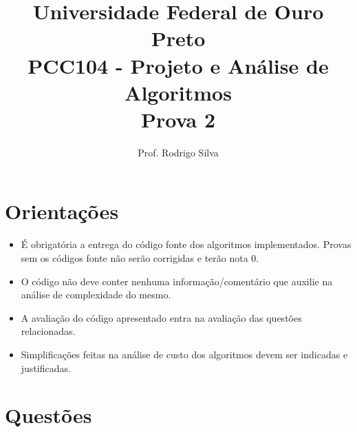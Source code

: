 \documentclass{article}
\title{\vspace{-2 cm}Universidade Federal de Ouro Preto \\ PCC104 - Projeto e Análise de Algoritmos \\ Prova 2}
\author{Prof. Rodrigo Silva}
\begin{document}
\maketitle

\section*{Orientações}

\begin{itemize}
    \item É obrigatória a entrega do código fonte dos algoritmos implementados. Provas sem os códigos fonte não serão corrigidas e terão nota 0.
    \item O código não deve conter nenhuma informação/comentário que auxilie na análise de complexidade do mesmo. 
    \item A avaliação do código apresentado entra na avaliação das questões relacionadas. 
    \item Simplificações feitas na análise de custo dos algoritmos devem ser indicadas e justificadas.
\end{itemize}

\section*{Questões}
\end{document}
